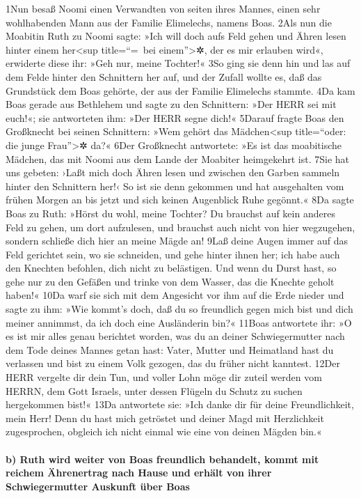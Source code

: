 1Nun besaß Noomi einen Verwandten von seiten ihres Mannes, einen sehr
wohlhabenden Mann aus der Familie Elimelechs, namens Boas. 2Als nun die
Moabitin Ruth zu Noomi sagte: »Ich will doch aufs Feld gehen und Ähren
lesen hinter einem her\textless sup title=``=~bei einem''\textgreater✲,
der es mir erlauben wird«, erwiderte diese ihr: »Geh nur, meine
Tochter!« 3So ging sie denn hin und las auf dem Felde hinter den
Schnittern her auf, und der Zufall wollte es, daß das Grundstück dem
Boas gehörte, der aus der Familie Elimelechs stammte. 4Da kam Boas
gerade aus Bethlehem und sagte zu den Schnittern: »Der HERR sei mit
euch!«; sie antworteten ihm: »Der HERR segne dich!« 5Darauf fragte Boas
den Großknecht bei seinen Schnittern: »Wem gehört das
Mädchen\textless sup title=``oder: die junge Frau''\textgreater✲ da?«
6Der Großknecht antwortete: »Es ist das moabitische Mädchen, das mit
Noomi aus dem Lande der Moabiter heimgekehrt ist. 7Sie hat uns gebeten:
›Laßt mich doch Ähren lesen und zwischen den Garben sammeln hinter den
Schnittern her!‹ So ist sie denn gekommen und hat ausgehalten vom frühen
Morgen an bis jetzt und sich keinen Augenblick Ruhe gegönnt.« 8Da sagte
Boas zu Ruth: »Hörst du wohl, meine Tochter? Du brauchst auf kein
anderes Feld zu gehen, um dort aufzulesen, und brauchst auch nicht von
hier wegzugehen, sondern schließe dich hier an meine Mägde an! 9Laß
deine Augen immer auf das Feld gerichtet sein, wo sie schneiden, und
gehe hinter ihnen her; ich habe auch den Knechten befohlen, dich nicht
zu belästigen. Und wenn du Durst hast, so gehe nur zu den Gefäßen und
trinke von dem Wasser, das die Knechte geholt haben!« 10Da warf sie sich
mit dem Angesicht vor ihm auf die Erde nieder und sagte zu ihm: »Wie
kommt's doch, daß du so freundlich gegen mich bist und dich meiner
annimmst, da ich doch eine Ausländerin bin?« 11Boas antwortete ihr: »O
es ist mir alles genau berichtet worden, was du an deiner
Schwiegermutter nach dem Tode deines Mannes getan hast: Vater, Mutter
und Heimatland hast du verlassen und bist zu einem Volk gezogen, das du
früher nicht kanntest. 12Der HERR vergelte dir dein Tun, und voller Lohn
möge dir zuteil werden vom HERRN, dem Gott Israels, unter dessen Flügeln
du Schutz zu suchen hergekommen bist!« 13Da antwortete sie: »Ich danke
dir für deine Freundlichkeit, mein Herr! Denn du hast mich getröstet und
deiner Magd mit Herzlichkeit zugesprochen, obgleich ich nicht einmal wie
eine von deinen Mägden bin.«

\hypertarget{b-ruth-wird-weiter-von-boas-freundlich-behandelt-kommt-mit-reichem-uxe4hrenertrag-nach-hause-und-erhuxe4lt-von-ihrer-schwiegermutter-auskunft-uxfcber-boas}{%
\paragraph{b) Ruth wird weiter von Boas freundlich behandelt, kommt mit
reichem Ährenertrag nach Hause und erhält von ihrer Schwiegermutter
Auskunft über
Boas}\label{b-ruth-wird-weiter-von-boas-freundlich-behandelt-kommt-mit-reichem-uxe4hrenertrag-nach-hause-und-erhuxe4lt-von-ihrer-schwiegermutter-auskunft-uxfcber-boas}}

